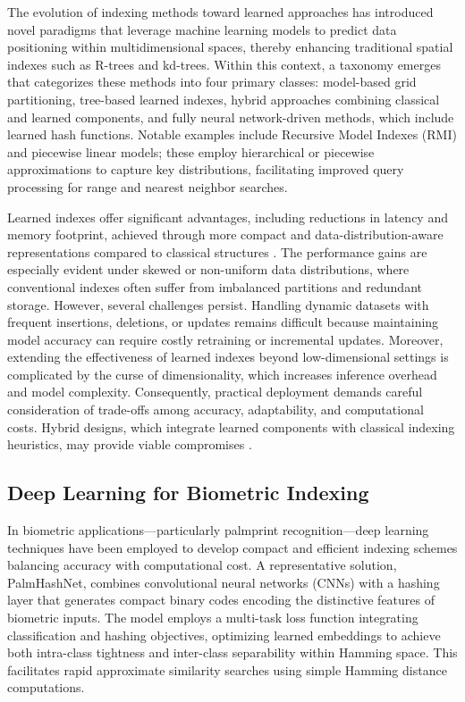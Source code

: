 \documentclass[sigconf]{acmart}
\begin{document}
The evolution of indexing methods toward learned approaches has introduced novel paradigms that leverage machine learning models to predict data positioning within multidimensional spaces, thereby enhancing traditional spatial indexes such as R-trees and kd-trees. Within this context, a taxonomy emerges that categorizes these methods into four primary classes: model-based grid partitioning, tree-based learned indexes, hybrid approaches combining classical and learned components, and fully neural network-driven methods, which include learned hash functions. Notable examples include Recursive Model Indexes (RMI) and piecewise linear models; these employ hierarchical or piecewise approximations to capture key distributions, facilitating improved query processing for range and nearest neighbor searches.

Learned indexes offer significant advantages, including reductions in latency and memory footprint, achieved through more compact and data-distribution-aware representations compared to classical structures \cite{ref34}. The performance gains are especially evident under skewed or non-uniform data distributions, where conventional indexes often suffer from imbalanced partitions and redundant storage. However, several challenges persist. Handling dynamic datasets with frequent insertions, deletions, or updates remains difficult because maintaining model accuracy can require costly retraining or incremental updates. Moreover, extending the effectiveness of learned indexes beyond low-dimensional settings is complicated by the curse of dimensionality, which increases inference overhead and model complexity. Consequently, practical deployment demands careful consideration of trade-offs among accuracy, adaptability, and computational costs. Hybrid designs, which integrate learned components with classical indexing heuristics, may provide viable compromises \cite{ref34}.

\subsection{Deep Learning for Biometric Indexing}

In biometric applications—particularly palmprint recognition—deep learning techniques have been employed to develop compact and efficient indexing schemes balancing accuracy with computational cost. A representative solution, PalmHashNet, combines convolutional neural networks (CNNs) with a hashing layer that generates compact binary codes encoding the distinctive features of biometric inputs. The model employs a multi-task loss function integrating classification and hashing objectives, optimizing learned embeddings to achieve both intra-class tightness and inter-class separability within Hamming space. This facilitates rapid approximate similarity searches using simple Hamming distance computations.
\end{document}
